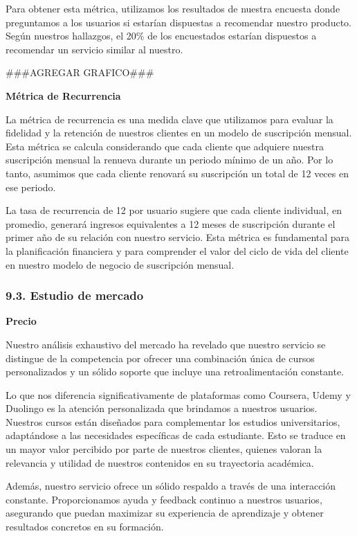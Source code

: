 \documentclass[
]{article}
\begin{document}
Para obtener esta métrica, utilizamos los resultados de nuestra encuesta
donde preguntamos a los usuarios si estarían dispuestas a recomendar
nuestro producto. Según nuestros hallazgos, el 20\% de los encuestados
estarían dispuestos a recomendar un servicio similar al nuestro.

\#\#\#AGREGAR GRAFICO\#\#\#

\textbf{Métrica de Recurrencia}

La métrica de recurrencia es una medida clave que utilizamos para
evaluar la fidelidad y la retención de nuestros clientes en un modelo de
suscripción mensual. Esta métrica se calcula considerando que cada
cliente que adquiere nuestra suscripción mensual la renueva durante un
periodo mínimo de un año. Por lo tanto, asumimos que cada cliente
renovará su suscripción un total de 12 veces en ese periodo.

La tasa de recurrencia de 12 por usuario sugiere que cada cliente
individual, en promedio, generará ingresos equivalentes a 12 meses de
suscripción durante el primer año de su relación con nuestro servicio.
Esta métrica es fundamental para la planificación financiera y para
comprender el valor del ciclo de vida del cliente en nuestro modelo de
negocio de suscripción mensual.

\subsubsection{9.3. Estudio de mercado}\label{estudio-de-mercado}

\textbf{Precio}

Nuestro análisis exhaustivo del mercado ha revelado que nuestro servicio
se distingue de la competencia por ofrecer una combinación única de
cursos personalizados y un sólido soporte que incluye una
retroalimentación constante.

Lo que nos diferencia significativamente de plataformas como Coursera,
Udemy y Duolingo es la atención personalizada que brindamos a nuestros
usuarios. Nuestros cursos están diseñados para complementar los estudios
universitarios, adaptándose a las necesidades específicas de cada
estudiante. Esto se traduce en un mayor valor percibido por parte de
nuestros clientes, quienes valoran la relevancia y utilidad de nuestros
contenidos en su trayectoria académica.

Además, nuestro servicio ofrece un sólido respaldo a través de una
interacción constante. Proporcionamos ayuda y feedback continuo a
nuestros usuarios, asegurando que puedan maximizar su experiencia de
aprendizaje y obtener resultados concretos en su formación.
\end{document}
